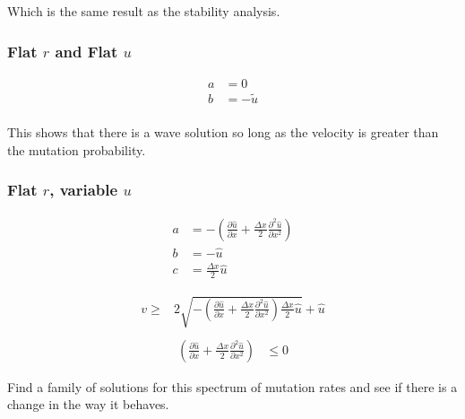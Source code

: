 \documentclass[a4paper]{article}
\begin{document}
Which is the same result as the stability analysis. 

\subsubsection*{Flat $r$ and Flat $u$}

\begin{align*}
a & = 0 \\
b & = - \tilde{u} \\
\end{align*}

This shows that there is a wave solution so long as the velocity is greater than the mutation probability. 

\subsubsection*{Flat $r$, variable $u$}

\begin{align*}
a & = - \left( \frac{\partial \hat{u}}{\partial x} + \frac{\Delta x}{2} \frac{\partial ^2 \hat{u}}{ \partial x ^2} \right) \\
b & = - \hat{u} \\
c & = \frac{\Delta x}{2} \hat{u}
\end{align*}

\begin{align*}
v \geq & 2 \sqrt{- \left( \frac{\partial \hat{u}}{\partial x} + \frac{\Delta x}{2} \frac{\partial ^2 \hat{u}}{ \partial x ^2} \right)\frac{\Delta x}{2} \hat{u} } + \hat{u} \\
\end{align*}
\begin{align*}
\left( \frac{\partial \hat{u}}{\partial x} + \frac{\Delta x}{2} \frac{\partial ^2 \hat{u}}{ \partial x ^2} \right) & \leq 0 
\end{align*}

Find a family of solutions for this spectrum of mutation rates and see if there is a change in the way it behaves. 
\end{document}
